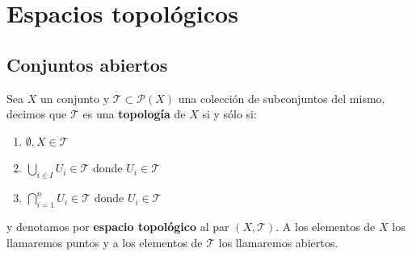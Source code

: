 \chapter{Espacios topológicos}
\label{cha:espacios_topologicos}

\section{Conjuntos abiertos}
\label{sec:conjuntos_abiertos}
\begin{defi}
Sea $X$ un conjunto y $\mathcal{T} \subset \mathcal{P}\left( X \right)$ una colección de subconjuntos del mismo, decimos que $\mathcal{T}$ es una \textbf{topología} de $X$ si y sólo si:
\begin{enumerate}
    \item $\emptyset, X \in \mathcal{T}$ 
    \item $\bigcup_{i \in I} U_i \in \mathcal{T}$ donde $U_i \in \mathcal{T}$
    \item $\bigcap_{i=1}^n U_i \in \mathcal{T}$ donde $U_i \in \mathcal{T}$
\end{enumerate}
y denotamos por \textbf{espacio topológico} al par $\left( X, \mathcal{T} \right)$. A los elementos de $X$ los llamaremos puntos y a los elementos de $\mathcal{T}$ los llamaremos abiertos.
\end{defi}

